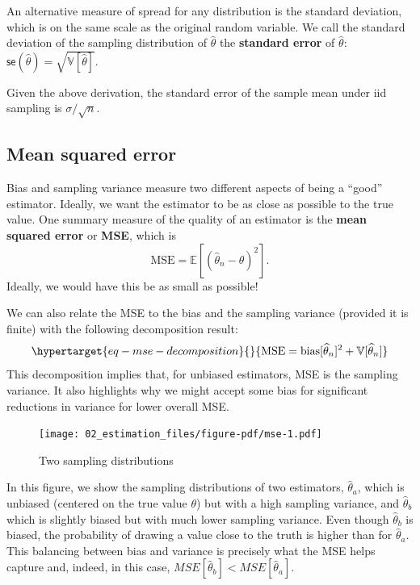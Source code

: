 \documentclass[
  letterpaper,
  DIV=11,
  numbers=noendperiod]{scrreprt}
\newcommand{\E}{\mathbb{E}}
\newcommand{\V}{\mathbb{V}}
\newcommand{\se}{\textsf{se}}
\theoremstyle{definition}
\theoremstyle{definition}
\theoremstyle{plain}
\theoremstyle{remark}
\begin{document}
An alternative measure of spread for any distribution is the standard
deviation, which is on the same scale as the original random variable.
We call the standard deviation of the sampling distribution of
\(\widehat{\theta}\) the \textbf{standard error} of
\(\widehat{\theta}\):
\(\se(\widehat{\theta}) = \sqrt{\V[\widehat{\theta}]}\).

Given the above derivation, the standard error of the sample mean under
iid sampling is \(\sigma / \sqrt{n}\).

\hypertarget{mean-squared-error}{%
\subsection{Mean squared error}\label{mean-squared-error}}

Bias and sampling variance measure two different aspects of being a
``good'' estimator. Ideally, we want the estimator to be as close as
possible to the true value. One summary measure of the quality of an
estimator is the \textbf{mean squared error} or \textbf{MSE}, which is\\
\[
\text{MSE} = \E[(\widehat{\theta}_n-\theta)^2].
\] Ideally, we would have this be as small as possible!

We can also relate the MSE to the bias and the sampling variance
(provided it is finite) with the following decomposition result:
\begin{equation}\protect\hypertarget{eq-mse-decomposition}{}{
\text{MSE} = \text{bias}[\widehat{\theta}_n]^2 + \V[\widehat{\theta}_n]
}\label{eq-mse-decomposition}\end{equation} This decomposition implies
that, for unbiased estimators, MSE is the sampling variance. It also
highlights why we might accept some bias for significant reductions in
variance for lower overall MSE.

\begin{figure}

{\centering \texttt{[image: 02\_estimation\_files/figure-pdf/mse-1.pdf]}

}

\caption{Two sampling distributions}

\end{figure}

In this figure, we show the sampling distributions of two estimators,
\(\widehat{\theta}_a\), which is unbiased (centered on the true value
\(\theta\)) but with a high sampling variance, and
\(\widehat{\theta}_b\) which is slightly biased but with much lower
sampling variance. Even though \(\widehat{\theta}_b\) is biased, the
probability of drawing a value close to the truth is higher than for
\(\widehat{\theta}_a\). This balancing between bias and variance is
precisely what the MSE helps capture and, indeed, in this case,
\(MSE[\widehat{\theta}_b] < MSE[\widehat{\theta}_a]\).
\end{document}
